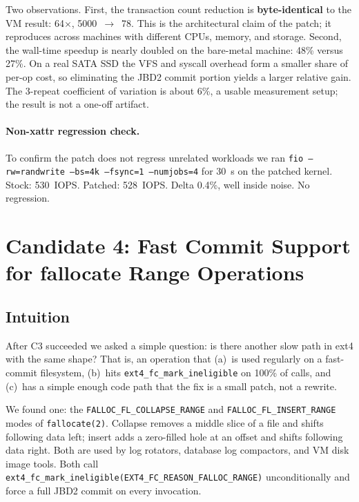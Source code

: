 \documentclass[12pt,a4paper]{article}
\begin{document}
Two observations.  First, the transaction count reduction is
\textbf{byte-identical} to the VM result: 64$\times$,
5000~$\to$~78.  This is the architectural claim of the patch;
it reproduces across machines with different CPUs, memory, and
storage.  Second, the wall-time speedup is nearly doubled on the
bare-metal machine: 48\% versus 27\%.  On a real SATA SSD the
VFS and syscall overhead form a smaller share of per-op cost, so
eliminating the JBD2 commit portion yields a larger relative gain.
The 3-repeat coefficient of variation is about 6\%, a usable
measurement setup; the result is not a one-off artifact.

\paragraph{Non-xattr regression check.}
To confirm the patch does not regress unrelated workloads we ran
\texttt{fio --rw=randwrite --bs=4k --fsync=1 --numjobs=4} for 30~s
on the patched kernel.  Stock: 530~IOPS.  Patched: 528~IOPS.
Delta 0.4\%, well inside noise.  No regression.

\section{Candidate 4: Fast Commit Support for fallocate Range Operations}

\subsection{Intuition}

After C3 succeeded we asked a simple question: is there another
slow path in ext4 with the same shape?  That is, an operation that
(a)~is used regularly on a fast-commit filesystem, (b)~hits
\texttt{ext4\_fc\_mark\_ineligible} on 100\% of calls, and (c)~has
a simple enough code path that the fix is a small patch, not a
rewrite.

We found one: the \texttt{FALLOC\_FL\_COLLAPSE\_RANGE} and
\texttt{FALLOC\_FL\_INSERT\_RANGE} modes of \texttt{fallocate(2)}.
Collapse removes a middle slice of a file and shifts following data
left; insert adds a zero-filled hole at an offset and shifts
following data right.  Both are used by log rotators, database log
compactors, and VM disk image tools.  Both call
\texttt{ext4\_fc\_mark\_ineligible(EXT4\_FC\_REASON\_FALLOC\_RANGE)}
unconditionally and force a full JBD2 commit on every invocation.
\end{document}
